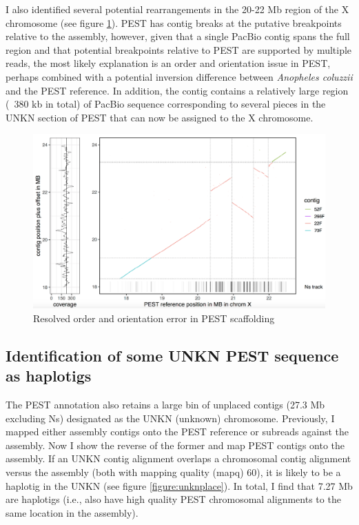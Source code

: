 \par{
I also identified several potential rearrangements in the 20-22 Mb region of the X chromosome (see figure \ref{figure:x_inversion}). PEST has contig breaks at the putative breakpoints relative to the assembly, however, given that a single PacBio contig spans the full region and that potential breakpoints relative to PEST are supported by multiple reads, the most likely explanation is an order and orientation issue in PEST, perhaps combined with a potential inversion difference between \textit{Anopheles coluzzii} and the PEST reference. In addition, the contig contains a relatively large region (~380 kb in total) of PacBio sequence corresponding to several pieces in the UNKN section of PEST that can now be assigned to the X chromosome.
}

\begin{figure}[htbp!]

\caption{Resolved order and orientation error in PEST scaffolding}
\label{figure:x_inversion}
\begin{centering}
\includegraphics[width=1.0\textwidth]{x_inversion.png}
\end{centering}

\end{figure}


\subsection{Identification of some UNKN PEST sequence as haplotigs}\label{section:unkn}

\par{
The PEST annotation also retains a large bin of unplaced contigs (27.3 Mb excluding Ns) designated as the UNKN (unknown) chromosome. Previously, I mapped either assembly contigs onto the PEST reference or subreads against the assembly. Now I show the reverse of the former and map PEST contigs onto the assembly. If an UNKN contig alignment overlaps a chromosomal contig alignment versus the assembly (both with mapping quality (mapq) 60), it is likely to be a haplotig in the UNKN (see figure \ref{figure:unknplace}). In total, I find that 7.27 Mb are haplotigs (i.e., also have high quality PEST chromosomal alignments to the same location in the assembly).
}

